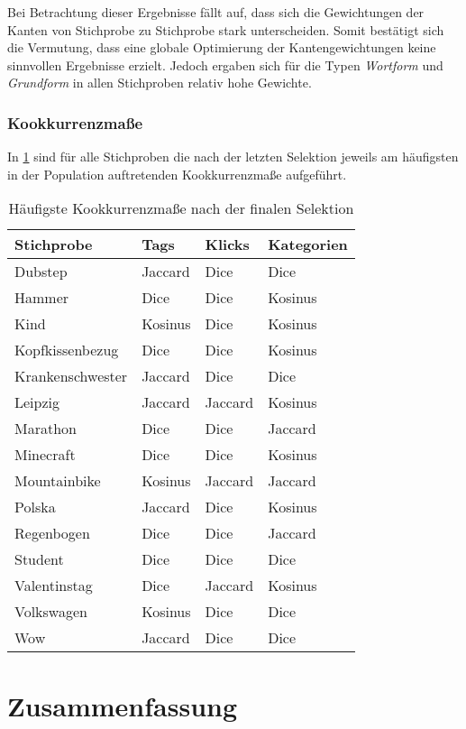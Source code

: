 Bei Betrachtung dieser Ergebnisse fällt auf, dass sich die Gewichtungen der Kanten von Stichprobe zu Stichprobe stark unterscheiden. Somit bestätigt sich die Vermutung, dass eine globale Optimierung der Kantengewichtungen keine sinnvollen Ergebnisse erzielt. Jedoch ergaben sich für die Typen \emph{Wortform} und \emph{Grundform} in allen Stichproben relativ hohe Gewichte.

\subsubsection{Kookkurrenzmaße}

In \cref{tab:measures_each} sind für alle Stichproben die nach der letzten Selektion jeweils am häufigsten in der Population auftretenden Kookkurrenzmaße aufgeführt.

\begin{table}
\centering
\begin{tabular}{llll}
    \toprule
    Stichprobe & Tags & Klicks & Kategorien \\
    \midrule
    Dubstep & Jaccard & Dice & Dice \\
    Hammer & Dice & Dice & Kosinus \\
    Kind & Kosinus & Dice & Kosinus \\
    Kopfkissenbezug & Dice & Dice & Kosinus \\
    Krankenschwester & Jaccard & Dice & Dice \\
    Leipzig & Jaccard & Jaccard & Kosinus \\
    Marathon & Dice & Dice & Jaccard \\
    Minecraft & Dice & Dice & Kosinus \\
    Mountainbike & Kosinus & Jaccard & Jaccard \\
    Polska & Jaccard & Dice & Kosinus \\
    Regenbogen & Dice & Dice & Jaccard \\
    Student & Dice & Dice & Dice \\
    Valentinstag & Dice & Jaccard & Kosinus \\
    Volkswagen & Kosinus & Dice & Dice \\
    Wow & Jaccard & Dice & Dice \\
    \bottomrule
\end{tabular}
\caption{Häufigste Kookkurrenzmaße nach der finalen Selektion}
\label{tab:measures_each}
\end{table}

\section{Zusammenfassung}